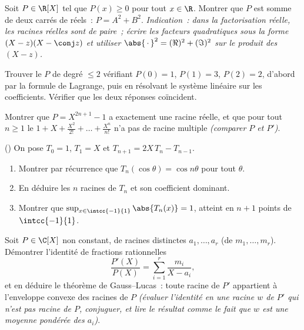 \begin{exercise}[$\star\star$]\label{exo:b1:poly:7}
Soit $P \in \R[X]$ tel que $P(x) \geq 0$ pour tout $x \in \R$. Montrer
que $P$ est somme de deux carrés de  réels~: $P = A^2 + B^2$.
\emph{Indication~: dans la factorisation réelle, les racines réelles
sont de  paire~; écrire les facteurs quadratiques sous la
forme $(X - z)(X - \conj z)$ et utiliser $\abs{\,\cdot\,}^2 = (\Re)^2 +
(\Im)^2$ sur le produit des $(X - z)$.}
\end{exercise}

\begin{exercise}[$\star\star$]\label{exo:b1:poly:8}
Trouver le  $P$ de degré $\leq 2$ vérifiant $P(0) = 1$, $P(1) =
3$, $P(2) = 2$, d'abord par la formule de Lagrange, puis en résolvant
le système linéaire sur les coefficients. Vérifier que les deux
réponses coïncident.
\end{exercise}

\begin{exercise}[$\star\star$]\label{exo:b1:poly:9}
Montrer que $P = X^{2n+1} - 1$ a exactement une racine réelle, et que
pour tout $n \geq 1$ le  $1 + X + \frac{X^2}{2!} + \dots +
\frac{X^n}{n!}$ n'a pas de racine multiple \emph{(comparer $P$ et
$P'$)}.
\end{exercise}

\begin{exercise}[$\star\star\star$]\label{exo:b1:poly:10}
() On pose $T_0 = 1$, $T_1 = X$ et $T_{n+1} =
2X\,T_n - T_{n-1}$.
\begin{enumerate}
  \item Montrer par récurrence que $T_n(\cos\theta) = \cos n\theta$
        pour tout $\theta$.
  \item En déduire les $n$ racines de $T_n$ et son coefficient
        dominant.
  \item Montrer que $\sup_{x \in \intcc{-1}{1}} \abs{T_n(x)} = 1$,
        atteint en $n + 1$ points de $\intcc{-1}{1}$.
\end{enumerate}
\end{exercise}

\begin{exercise}[$\star\star\star$]\label{exo:b1:poly:11}
Soit $P \in \C[X]$ non constant, de racines distinctes $a_1, \dots,
a_r$ (de  $m_1, \dots, m_r$). Démontrer l'identité de
fractions rationnelles
\[
\frac{P'(X)}{P(X)} = \sum_{i=1}^{r} \frac{m_i}{X - a_i},
\]
et en déduire le théorème de Gauss--Lucas~: toute racine de $P'$
appartient à l'enveloppe convexe des racines de $P$ \emph{(évaluer
l'identité en une racine $w$ de $P'$ qui n'est pas racine de $P$,
conjuguer, et lire le résultat comme le fait que $w$ est une moyenne
pondérée des $a_i$)}.
\end{exercise}

